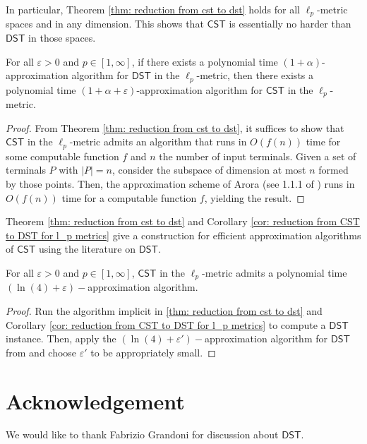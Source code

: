 \documentclass{theoretics}
\newcommand{\1}{\textbf{1}}
\newcommand{\cst}{$\mathsf{CST}$\xspace}
\newcommand{\dst}{$\mathsf{DST}$\xspace}
\begin{document}
In particular, Theorem \ref{thm: reduction from cst to dst} holds for all $\ell_p$-metric spaces and in any dimension. This shows that \cst is essentially no harder than \dst in those spaces.
\begin{corollary} \label{cor: reduction from CST to DST for l_p metrics}
For all $\varepsilon > 0$ and $p \in [1, \infty]$, if there exists a polynomial time $(1 + \alpha)$-approximation algorithm for \dst in the $\ell_p$-metric, then there exists a polynomial time $(1 + \alpha + \varepsilon)$-approximation algorithm for \cst in the $\ell_p$-metric.
\end{corollary}
\begin{proof}
From Theorem \ref{thm: reduction from cst to dst}, it suffices to show that \cst in the $\ell_p$-metric admits an algorithm that runs in $O(f(n))$ time for some computable function $f$ and $n$ the number of input terminals. Given a set of terminals $P$ with $|P| = n$, consider the subspace of dimension at most $n$ formed by those points. Then, the approximation scheme of Arora (see 1.1.1 of \cite{Arora_1998}) runs in $O(f(n))$ time for a computable function $f$, yielding the result.
\end{proof}

Theorem \ref{thm: reduction from cst to dst} and Corollary \ref{cor: reduction from CST to DST for l_p metrics} give a construction for efficient approximation algorithms of \cst using the literature on \dst.
\begin{corollary}\label{cor:alg}
For all $\varepsilon > 0$ and $p \in [1, \infty]$,  \cst in the $\ell_p$-metric admits a polynomial time $(\ln(4) + \varepsilon)-$approximation algorithm.
\end{corollary}
\begin{proof}
Run the algorithm implicit in \ref{thm: reduction from cst to dst} and Corollary \ref{cor: reduction from CST to DST for l_p metrics} to compute a \dst instance. Then, apply the $(\ln(4) + \varepsilon')-$approximation algorithm for \dst from \cite{byrka2017improved} and choose $\varepsilon'$ to be appropriately small. 
\end{proof}


 \section*{Acknowledgement}
We would like to thank Fabrizio Grandoni for discussion about \dst.
\newpage
\end{document}
